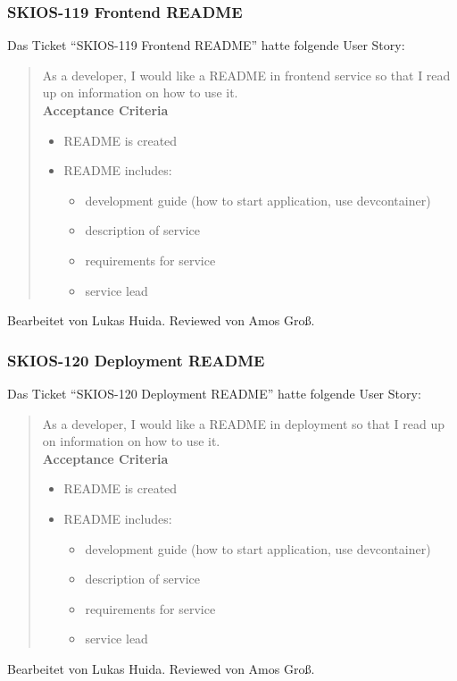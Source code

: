 \subsubsection{SKIOS-119 Frontend README}
Das Ticket \enquote{SKIOS-119 Frontend README} hatte folgende User Story:
\begin{quotation}
    As a developer, I would like a README in frontend service so that I read up on information on how to use it. \\
\textbf{Acceptance Criteria}
\begin{itemize}
    \item README is created
    \item README includes:
    \begin{itemize}
        \item development guide (how to start application, use devcontainer)
        \item description of service
        \item requirements for service
        \item service lead
    \end{itemize}
\end{itemize}
\end{quotation}
Bearbeitet von Lukas Huida.
Reviewed von Amos Groß.

\subsubsection{SKIOS-120 Deployment README}
Das Ticket \enquote{SKIOS-120 Deployment README} hatte folgende User Story:
\begin{quotation}
    As a developer, I would like a README in deployment so that I read up on information on how to use it. \\
\textbf{Acceptance Criteria}
\begin{itemize}
    \item README is created
    \item README includes:
    \begin{itemize}
        \item development guide (how to start application, use devcontainer)
        \item description of service
        \item requirements for service
        \item service lead
    \end{itemize}
\end{itemize}
\end{quotation}
Bearbeitet von Lukas Huida.
Reviewed von Amos Groß.

